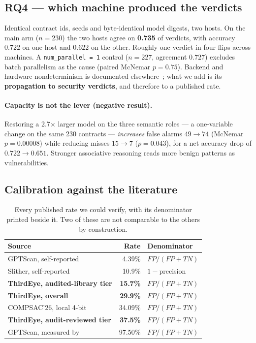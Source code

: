 \documentclass[sigconf,nonacm]{acmart}
\newcommand{\tool}{ThirdEye}
\begin{document}
\subsection{RQ4 --- which machine produced the verdicts}

Identical contract ids, seeds and byte-identical model digests, two hosts. On the
main arm ($n = 230$) the two hosts agree on \textbf{0.735} of verdicts, with
accuracy $0.722$ on one host and $0.622$ on the other. Roughly one verdict in four
flips across machines. A \texttt{num\_parallel = 1} control ($n = 227$, agreement
$0.727$) excludes batch parallelism as the cause (paired McNemar $p = 0.75$).
Backend and hardware nondeterminism is documented
elsewhere~\cite{pape}; what we add is its \textbf{propagation to security
verdicts}, and therefore to a published rate.

\paragraph{Capacity is not the lever (negative result).}
Restoring a 2.7$\times$ larger model on the three semantic roles --- a
one-variable change on the same 230 contracts --- \emph{increases} false alarms
$49 \rightarrow 74$ (McNemar $p = 0.00008$) while reducing misses
$15 \rightarrow 7$ ($p = 0.043$), for a net accuracy drop of
$0.722 \rightarrow 0.651$. Stronger associative reasoning reads more benign
patterns as vulnerabilities.

\subsection{Calibration against the literature}
\label{sec:calibration}

\begin{table}[t]
\centering
\caption{Every published rate we could verify, with its denominator printed
beside it. Two of these are not comparable to the others by construction.}
\label{tab:calibration}
\small
\begin{tabular}{@{}lrl@{}}
\toprule
\textbf{Source} & \textbf{Rate} & \textbf{Denominator} \\
\midrule
GPTScan, self-reported & 4.39\% & $FP/(FP{+}TN)$ \\
Slither, self-reported & 10.9\% & $1-$precision \\
\textbf{\tool{}, audited-library tier} & \textbf{15.7\%} & $FP/(FP{+}TN)$ \\
\textbf{\tool{}, overall} & \textbf{29.9\%} & $FP/(FP{+}TN)$ \\
COMPSAC'26, local 4-bit & 34.09\% & $FP/(FP{+}TN)$ \\
\textbf{\tool{}, audit-reviewed tier} & \textbf{37.5\%} & $FP/(FP{+}TN)$ \\
GPTScan, measured by~\cite{heimdallr} & 97.50\% & $FP/(FP{+}TN)$ \\
\bottomrule
\end{tabular}
\end{table}
\end{document}

